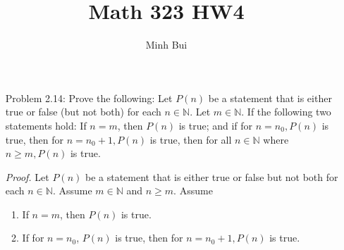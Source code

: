 \documentclass{article}
\author{Minh Bui}
\title{Math 323 HW4}
\begin{document}
\maketitle
\begin{enumerate}
    \item[Problem 2.14:] Prove the following: Let $P(n)$ be a statement that is either true or false (but not both) for each $n \in \mathbb{N}$. Let $m \in \mathbb{N}$. If the following two statements hold: If $n = m$, then $P(n)$ is true; and if for $n = n_0, P(n)$ is true, then for $n = n_0 + 1, P(n)$ is true, then for all $n \in \mathbb{N}$ where $n \ge m, P(n)$ is true.
    \item[] \emph{Proof.} Let $P(n)$ be a statement that is either true or false but not both for each $n \in \mathbb{N}$. Assume $m \in \mathbb{N}$ and $n \ge m$. Assume
        \begin{enumerate}
            \item If $n = m$, then $P(n)$ is true.
            \item If for $n = n_0$, $P(n)$ is true, then for $n = n_0 + 1, P(n)$ is true.
        \end{enumerate}


\end{enumerate}
\end{document}
